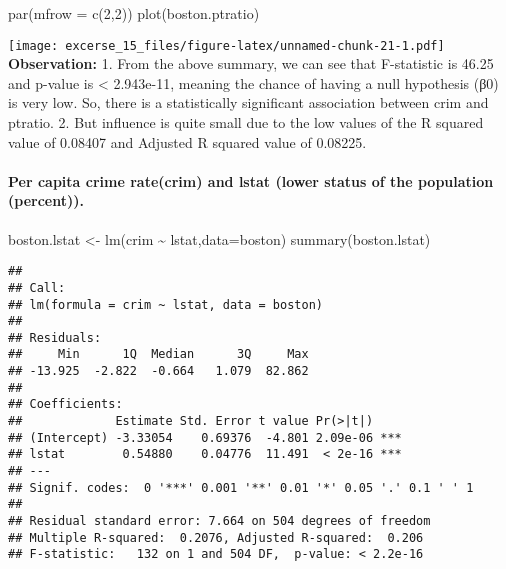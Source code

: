 \documentclass[
]{article}
\newenvironment{Shaded}{\begin{snugshade}}{\end{snugshade}}
\newcommand{\AttributeTok}[1]{\textcolor[rgb]{0.77,0.63,0.00}{#1}}
\newcommand{\DecValTok}[1]{\textcolor[rgb]{0.00,0.00,0.81}{#1}}
\newcommand{\FunctionTok}[1]{\textcolor[rgb]{0.00,0.00,0.00}{#1}}
\newcommand{\NormalTok}[1]{#1}
\newcommand{\OtherTok}[1]{\textcolor[rgb]{0.56,0.35,0.01}{#1}}
\newcommand{\SpecialCharTok}[1]{\textcolor[rgb]{0.00,0.00,0.00}{#1}}
\begin{document}
\begin{Shaded}
\begin{Highlighting}[]
\FunctionTok{par}\NormalTok{(}\AttributeTok{mfrow =} \FunctionTok{c}\NormalTok{(}\DecValTok{2}\NormalTok{,}\DecValTok{2}\NormalTok{))}
\FunctionTok{plot}\NormalTok{(boston.ptratio)}
\end{Highlighting}
\end{Shaded}

\texttt{[image: excerse\_15\_files/figure-latex/unnamed-chunk-21-1.pdf]}
\textbf{Observation:} 1. From the above summary, we can see that
F-statistic is 46.25 and p-value is \textless{} 2.943e-11, meaning the
chance of having a null hypothesis (β0) is very low. So, there is a
statistically significant association between crim and ptratio. 2. But
influence is quite small due to the low values of the R squared value of
0.08407 and Adjusted R squared value of 0.08225.

\hypertarget{per-capita-crime-ratecrim-and-lstat-lower-status-of-the-population-percent.}{%
\paragraph{Per capita crime rate(crim) and lstat (lower status of the
population
(percent)).}\label{per-capita-crime-ratecrim-and-lstat-lower-status-of-the-population-percent.}}

\begin{Shaded}
\begin{Highlighting}[]
\NormalTok{boston.lstat }\OtherTok{\textless{}{-}} \FunctionTok{lm}\NormalTok{(crim }\SpecialCharTok{\textasciitilde{}}\NormalTok{ lstat,}\AttributeTok{data=}\NormalTok{boston)}
\FunctionTok{summary}\NormalTok{(boston.lstat)}
\end{Highlighting}
\end{Shaded}

\begin{verbatim}
## 
## Call:
## lm(formula = crim ~ lstat, data = boston)
## 
## Residuals:
##     Min      1Q  Median      3Q     Max 
## -13.925  -2.822  -0.664   1.079  82.862 
## 
## Coefficients:
##             Estimate Std. Error t value Pr(>|t|)    
## (Intercept) -3.33054    0.69376  -4.801 2.09e-06 ***
## lstat        0.54880    0.04776  11.491  < 2e-16 ***
## ---
## Signif. codes:  0 '***' 0.001 '**' 0.01 '*' 0.05 '.' 0.1 ' ' 1
## 
## Residual standard error: 7.664 on 504 degrees of freedom
## Multiple R-squared:  0.2076, Adjusted R-squared:  0.206 
## F-statistic:   132 on 1 and 504 DF,  p-value: < 2.2e-16
\end{verbatim}
\end{document}
